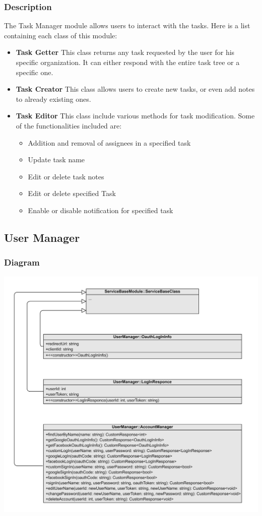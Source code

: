 \documentclass{article}
\begin{document}
\subsubsection{Description}
The Task Manager module allows users to interact with the tasks. Here is a list containing each class of this module:
\begin{itemize}
    \item \textbf{Task Getter}
    This class returns any task requested by the user for his specific organization. It can either respond with the entire task tree or a specific one.
    \item \textbf{Task Creator}
    This class allows users to create new tasks, or even add notes to already existing ones.
    \item \textbf{Task Editor}
    This class include various methods for task modification. Some of the functionalities included are:
    \begin{itemize}
        \item Addition and removal of assignees in a specified task
        \item Update task name
        \item Edit or delete task notes
        \item Edit or delete specified Task
        \item Enable or disable notification for specified task
    \end{itemize}
\end{itemize}
\subsection{User Manager}

\subsubsection{Diagram}

\includegraphics[width=\textwidth,height=\textheight,keepaspectratio]{images/class_diagram/user_manager.jpg}
\end{document}
